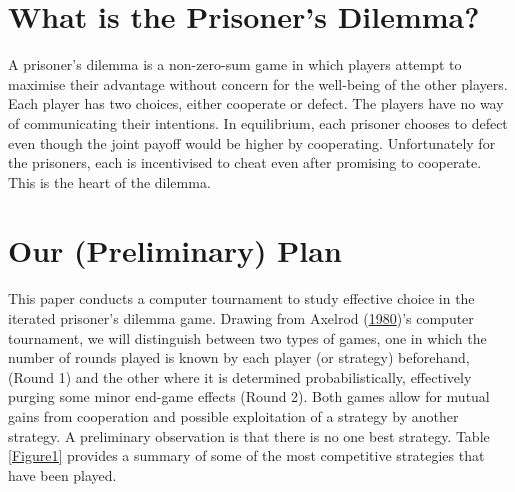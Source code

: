 \documentclass[11pt,preprint, authoryear]{elsarticle}
\numberwithin{equation}{section}
\numberwithin{figure}{section}
\numberwithin{table}{section}
\begin{document}
\hypertarget{what-is-the-prisoners-dilemma}{%
\section{What is the Prisoner's
Dilemma?}\label{what-is-the-prisoners-dilemma}}

A prisoner's dilemma is a non-zero-sum game in which players attempt to
maximise their advantage without concern for the well-being of the other
players. Each player has two choices, either cooperate or defect. The
players have no way of communicating their intentions. In equilibrium,
each prisoner chooses to defect even though the joint payoff would be
higher by cooperating. Unfortunately for the prisoners, each is
incentivised to cheat even after promising to cooperate. This is the
heart of the dilemma.

\hypertarget{our-preliminary-plan}{%
\section{Our (Preliminary) Plan}\label{our-preliminary-plan}}

This paper conducts a computer tournament to study effective choice in
the iterated prisoner's dilemma game. Drawing from Axelrod
(\protect\hyperlink{ref-axelrod1980}{1980})'s computer tournament, we
will distinguish between two types of games, one in which the number of
rounds played is known by each player (or strategy) beforehand, (Round
1) and the other where it is determined probabilistically, effectively
purging some minor end-game effects (Round 2). Both games allow for
mutual gains from cooperation and possible exploitation of a strategy by
another strategy. A preliminary observation is that there is no one best
strategy. Table \ref{Figure1} provides a summary of some of the most
competitive strategies that have been played.
\end{document}
